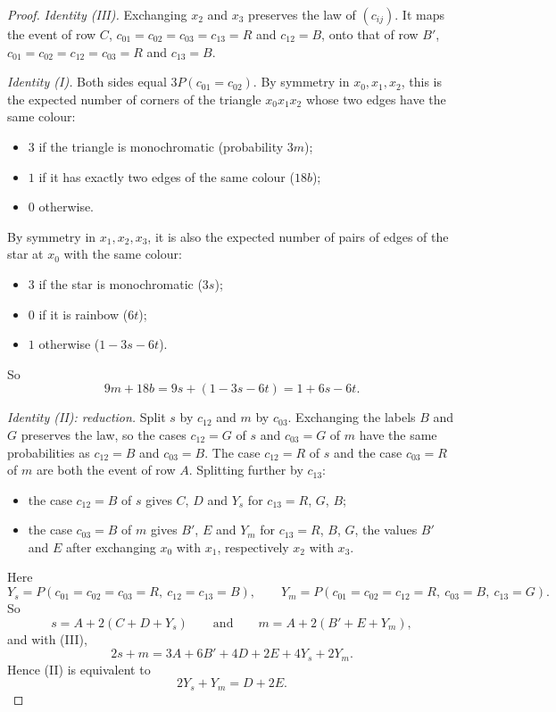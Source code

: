 \documentclass[11pt]{article}
\theoremstyle{spacedplain}
\theoremstyle{spaceddef}
\theoremstyle{spacedremark}
\begin{document}
\begin{proof}
\emph{Identity (III).}
Exchanging $x_2$ and $x_3$ preserves the law of $(c_{ij})$.
It maps the event of row $C$, $c_{01}=c_{02}=c_{03}=c_{13}=R$ and $c_{12}=B$, onto that of row $B'$, $c_{01}=c_{02}=c_{12}=c_{03}=R$ and $c_{13}=B$.

\emph{Identity (I).}
Both sides equal $3P(c_{01}{=}c_{02})$.
By symmetry in $x_0,x_1,x_2$, this is the expected number of corners of the triangle $x_0x_1x_2$ whose two edges have the same colour:
\begin{itemize}
\item $3$ if the triangle is monochromatic (probability $3m$);
\item $1$ if it has exactly two edges of the same colour ($18b$);
\item $0$ otherwise.
\end{itemize}
By symmetry in $x_1,x_2,x_3$, it is also the expected number of pairs of edges of the star at $x_0$ with the same colour:
\begin{itemize}
\item $3$ if the star is monochromatic ($3s$);
\item $0$ if it is rainbow ($6t$);
\item $1$ otherwise ($1-3s-6t$).
\end{itemize}
So
\[
9m+18b=9s+(1-3s-6t)=1+6s-6t.
\]

\emph{Identity (II): reduction.}
Split $s$ by $c_{12}$ and $m$ by $c_{03}$.
Exchanging the labels $B$ and $G$ preserves the law, so the cases $c_{12}=G$ of $s$ and $c_{03}=G$ of $m$ have the same probabilities as $c_{12}=B$ and $c_{03}=B$.
The case $c_{12}=R$ of $s$ and the case $c_{03}=R$ of $m$ are both the event of row $A$.
Splitting further by $c_{13}$:
\begin{itemize}
\item the case $c_{12}=B$ of $s$ gives $C$, $D$ and $Y_s$ for $c_{13}=R$, $G$, $B$;
\item the case $c_{03}=B$ of $m$ gives $B'$, $E$ and $Y_m$ for $c_{13}=R$, $B$, $G$, the values $B'$ and $E$ after exchanging $x_0$ with $x_1$, respectively $x_2$ with $x_3$.
\end{itemize}
Here
\[
Y_s=P(c_{01}{=}c_{02}{=}c_{03}{=}R,\ c_{12}{=}c_{13}{=}B),\qquad Y_m=P(c_{01}{=}c_{02}{=}c_{12}{=}R,\ c_{03}{=}B,\ c_{13}{=}G).
\]
So
\[
s=A+2(C+D+Y_s)\qquad\text{and}\qquad m=A+2(B'+E+Y_m),
\]
and with (III),
\[
2s+m=3A+6B'+4D+2E+4Y_s+2Y_m.
\]
Hence (II) is equivalent to
\[
2Y_s+Y_m=D+2E.
\]


\end{proof}
\end{document}
